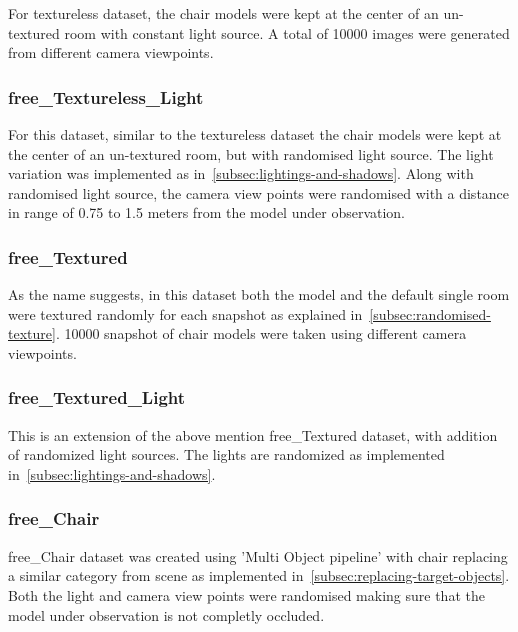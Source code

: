     For textureless dataset, the chair models were kept at the center of an un-textured room with constant light source.
    A total of 10000 images were generated from different camera viewpoints.

\subsubsection{\Gls{free}\_Textureless\_Light}

    For this dataset, similar to the textureless dataset the chair models were kept at the center of an un-textured room, but with randomised light source.
    The light variation was implemented as in~\ref{subsec:lightings-and-shadows}.
    Along with randomised light source, the camera view points were randomised with a distance in range of 0.75 to 1.5 meters from the model under observation.

\subsubsection{\Gls{free}\_Textured}

    As the name suggests, in this dataset both the model and the default single room were textured randomly for each snapshot as explained in~\ref{subsec:randomised-texture}.
    10000 snapshot of chair models were taken using different camera viewpoints.

\subsubsection{\Gls{free}\_Textured\_Light}

    This is an extension of the above mention \gls{free}\_Textured dataset, with addition of randomized light sources.
    The lights are randomized as implemented in~\ref{subsec:lightings-and-shadows}.

\subsubsection{\gls{free}\_Chair}

    \Gls{free}\_Chair dataset was created using 'Multi Object pipeline' with chair replacing a similar category from scene as implemented in~\ref{subsec:replacing-target-objects}.
    Both the light and camera view points were randomised making sure that the model under observation is not completly occluded.


